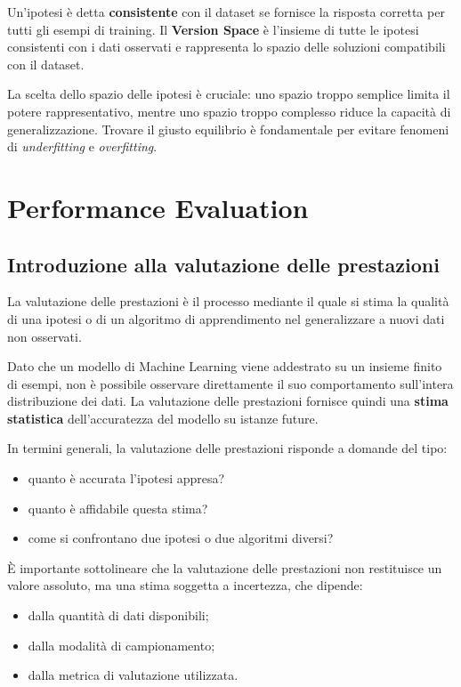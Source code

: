 \documentclass[a4paper,12pt]{report}
\begin{document}
\begin{center}
{\begin{minipage}{0.95\textwidth}
Un’ipotesi è detta \textbf{consistente} con il dataset se fornisce la risposta corretta per tutti gli esempi di training.
Il \textbf{Version Space} è l’insieme di tutte le ipotesi consistenti con i dati osservati e rappresenta lo spazio delle soluzioni compatibili con il dataset.

La scelta dello spazio delle ipotesi è cruciale: uno spazio troppo semplice limita il potere rappresentativo, mentre uno spazio troppo complesso riduce la capacità di generalizzazione.
Trovare il giusto equilibrio è fondamentale per evitare fenomeni di \textit{underfitting} e \textit{overfitting}.

\end{minipage}
}
\end{center}

\chapter{Performance Evaluation}

\section{Introduzione alla valutazione delle prestazioni}

La valutazione delle prestazioni è il processo mediante il quale si stima la qualità di una ipotesi o di un algoritmo di apprendimento nel generalizzare a nuovi dati non osservati.

Dato che un modello di Machine Learning viene addestrato su un insieme finito di esempi, non è possibile osservare direttamente il suo comportamento sull’intera distribuzione dei dati.
La valutazione delle prestazioni fornisce quindi una \textbf{stima statistica} dell’accuratezza del modello su istanze future.

In termini generali, la valutazione delle prestazioni risponde a domande del tipo:
\begin{itemize}
    \item quanto è accurata l’ipotesi appresa?
    \item quanto è affidabile questa stima?
    \item come si confrontano due ipotesi o due algoritmi diversi?
\end{itemize}

È importante sottolineare che la valutazione delle prestazioni non restituisce un valore assoluto, ma una stima soggetta a incertezza, che dipende:
\begin{itemize}
    \item dalla quantità di dati disponibili;
    \item dalla modalità di campionamento;
    \item dalla metrica di valutazione utilizzata.
\end{itemize}
\end{document}
